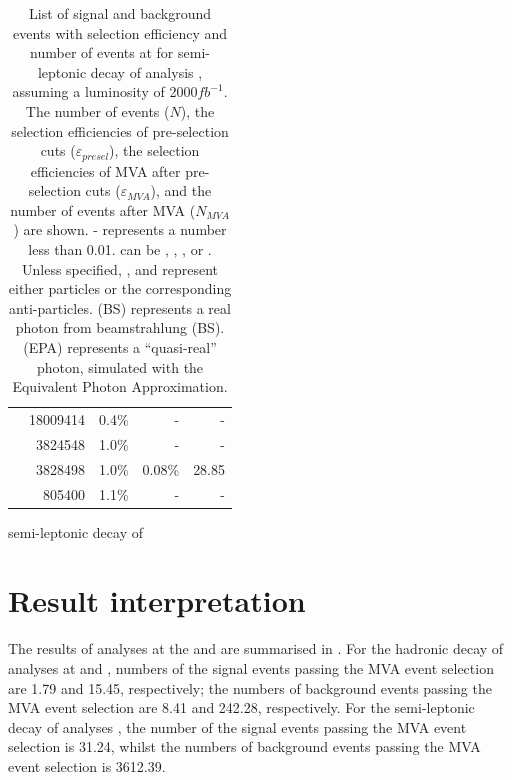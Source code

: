 \begin{table}[!tbp]
\begin{tabular}{lrrrr}
\hline
\gammagamma{\Pphoton}{\BS}{\Pphoton}{\BS}{ \Pquark \Pquark \Pquark \Pquark}& 18009414  & 0.4\%&   - & - \\
\gammagamma{\Pphoton}{\BS}{\Pphoton}{\EPA}{ \Pquark \Pquark \Pquark \Pquark}& 3824548 & 1.0\%&  - & - \\
\gammagamma{\Pphoton}{\EPA}{\Pphoton}{\BS}{ \Pquark \Pquark \Pquark \Pquark}& 3828498 & 1.0\%&  0.08\% & 28.85 \\
\gammagamma{\Pphoton}{\EPA}{\Pphoton}{\EPA}{ \Pquark \Pquark \Pquark \Pquark}& 805400& 1.1\%&  - & - \\
\hline \hline
\end{tabular} semi-leptonic \WW decay of \eeToHHbbWW
\caption
{List of signal and background events with selection efficiency and number of events at   for semi-leptonic \WW decay of \eeToHHbbWW analysis , assuming a luminosity of 2000$fb^{-1}$. The number of events ($N$), the selection efficiencies of pre-selection cuts ($\varepsilon_{presel}$), the selection efficiencies of MVA after pre-selection cuts ($\varepsilon_{MVA}$), and the number of events after MVA ($N_{MVA}$) are shown. - represents a number less than 0.01. \Pquark can be \Pup, \Pdown, \Pstrange, \Pbottom or \Ptop. Unless specified, \Pquark, \Plepton and \Pnu represent either particles or the corresponding anti-particles. \Pphoton(BS) represents a real photon from beamstrahlung (BS). \Pphoton(EPA) represents a ``quasi-real'' photon, simulated with the Equivalent Photon Approximation.}
\label{tab:doubleHiggsQlv3TeVMVA}
\end{table}

\section{Result interpretation}
\label{sec:doubleHiggsResults}



The results of analyses at the  and   are summarised in . For the hadronic \WW decay of \eeToHHbbWW analyses at  and , numbers of the signal events passing the MVA event selection are 1.79 and 15.45, respectively; the numbers of background events passing the MVA event selection are 8.41 and 242.28, respectively. For  the semi-leptonic \WW decay of \eeToHHbbWW analyses , the number of the signal events passing the MVA event selection is 31.24, whilst the  numbers of background events passing the MVA event selection is 3612.39.



